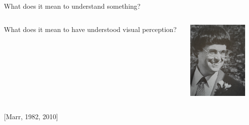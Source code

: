 \documentclass[]{beamer}
\begin{document}
\begin{frame}{What does it mean to understand something?}

\begin{overlayarea}{110mm}{70mm}
\begin{columns}[T]
\begin{column}{60mm}
\vspace{5mm}
\begin{center}
  What does it mean to have understood visual perception?
\end{center}
\end{column}
\begin{column}{50mm}
  \begin{center}  
\includegraphics[width=30mm]{figs/marr.jpg}
  \end{center}
\end{column}
\end{columns}

\end{overlayarea}
\begin{center}
\scriptsize{[Marr, 1982, 2010]}
\end{center}
\end{frame}
\end{document}
